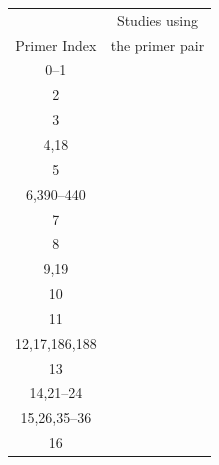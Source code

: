 \begin{center}
    \begin{tabular}{ | c | c |}
        & Studies using \\
        Primer Index &  the primer pair \\
        \hline
        0--1 &~\cite{xpression_patterns_transcribed_HERVs_in_human,hml2_rna_transcript_select_pack_retro_particles} \\
        2 &~\cite{herv_K_activ_required_4_CD133_melanoma_cells} \\
        3 &~\cite{xpress_hervk_env_transcript_breast_cancer} \\
        4,18 &~\cite{activ_HERVK_impl_melanoma_cell_malignant,xpress_HERVK_corr_status_MEERK_CDK4_path_melanoma} \\
        5 &~\cite{xpress_hervk_env_transcript_breast_cancer,quant_hervK_xpress_splicing_breast_cancer} \\
        6,390--440 &~\cite{hervk_provirus_uniq_human}\\
        7 &~\cite{inftect_by_HIV_subtypes_diff_elev_hervk_transcript_tcells,modul_HERV_transcript_during_HIV_infect} \\
        8 &~\cite{sig_upreg_hml2_transcript_level_human_lung_cancer,id_diff_express_hml2_loci_colorectal_cancer} \\
        9,19 &~\cite{herv_xpress_inv_associated_immune_activ_HIV} \\
        10 &~\cite{inftect_by_HIV_subtypes_diff_elev_hervk_transcript_tcells,sig_upreg_hml2_transcript_level_human_lung_cancer,id_diff_express_hml2_loci_colorectal_cancer} \\
        11 &~\cite{an_ERV_derived_human_melanoma,activ_HERVK_impl_melanoma_cell_malignant,xpress_HERVK_corr_status_MEERK_CDK4_path_melanoma,lack_corr_between_HERVK_HIV_plasma} \\
        12,17,186,188 &~\cite{distinct_roles_L1_HERVK_cell_prolif_diff_prog} \\
        13 &~\cite{xpress_HERV_K_proviruses_leukocytes} \\
        14,21--24 &~\cite{hml2_RNA_prot_xpress_marker_human_emb_iPSCs} \\
        15,26,35--36 &~\cite{hml2_rna_transcript_select_pack_retro_particles} \\
        16 &~\cite{inftect_by_HIV_subtypes_diff_elev_hervk_transcript_tcells,sig_upreg_hml2_transcript_level_human_lung_cancer,id_diff_express_hml2_loci_colorectal_cancer,xpress_HERVK_HML2_corr_activ_macrophages_IFN} \\

\end{tabular}
\end{center}
